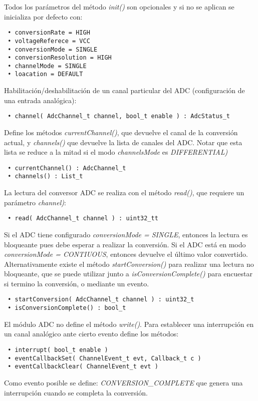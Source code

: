 Todos los parámetros del método \emph{init()} son opcionales y si no se aplican se inicializa por defecto con:

\begin{verbatim}
 • conversionRate = HIGH
 • voltageReferece = VCC
 • conversionMode = SINGLE
 • conversionResolution = HIGH
 • channelMode = SINGLE
 • loacation = DEFAULT
\end{verbatim}

Habilitación/deshabilitación de un canal particular del ADC (configuración de una entrada analógica):

\begin{verbatim}
 • channel( AdcChannel_t channel, bool_t enable ) : AdcStatus_t
\end{verbatim}

Define los métodos \emph{currentChannel()}, que devuelve el canal de la conversión actual, y \emph{channels()} que devuelve la lista de canales del ADC. Notar que esta lista se reduce a la mitad si el modo \emph{channelsMode} es \emph{DIFFERENTIAL)}

\begin{verbatim}
 • currentChannel() : AdcChannel_t
 • channels() : List_t
\end{verbatim}

La lectura del conversor ADC se realiza con el método \emph{read()}, que requiere un parámetro \emph{channel)}:

\begin{verbatim}
 • read( AdcChannel_t channel ) : uint32_tt
\end{verbatim}

Si el ADC tiene configurado \emph{conversionMode = SINGLE}, entonces la lectura es bloqueante pues debe esperar a realizar la conversión. Si el ADC está en modo \emph{conversionMode = CONTIUOUS}, entonces devuelve el último valor convertido. Alternativamente existe el método \emph{startConversion()} para realizar una lectura no bloqueante, que se puede utilizar junto a \emph{isConversionComplete()} para encuestar si termino la conversión, o mediante un evento.

\begin{verbatim}
 • startConversion( AdcChannel_t channel ) : uint32_t
 • isConversionComplete() : bool_t
\end{verbatim}

El módulo ADC no define el método \emph{write()}. Para establecer una interrupción en un canal analógico ante cierto evento define los métodos: 

\begin{verbatim}
 • interrupt( bool_t enable )
 • eventCallbackSet( ChannelEvent_t evt, Callback_t c )
 • eventCallbackClear( ChannelEvent_t evt )
\end{verbatim}

Como evento posible se define: \emph{CONVERSION\_COMPLETE} que genera una interrupción cuando se completa la conversión.
